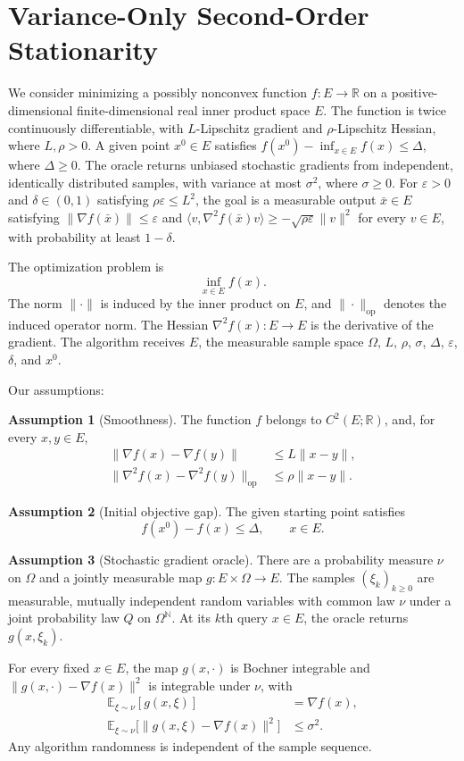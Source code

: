 \documentclass[10pt]{article}
\theoremstyle{definition}
\newtheorem{assumption}{Assumption}
\begin{document}
\section*{Variance-Only Second-Order Stationarity}
We consider minimizing a possibly nonconvex function $f:E\to\mathbb{R}$ on a positive-dimensional finite-dimensional real inner product space $E$. The function is twice continuously differentiable, with $L$-Lipschitz gradient and $\rho$-Lipschitz Hessian, where $L,\rho>0$. A given point $x^0\in E$ satisfies $f(x^0)-\inf_{x\in E}f(x)\leq\Delta$, where $\Delta\geq0$. The oracle returns unbiased stochastic gradients from independent, identically distributed samples, with variance at most $\sigma^2$, where $\sigma\geq0$. For $\varepsilon>0$ and $\delta\in(0,1)$ satisfying $\rho\varepsilon\leq L^2$, the goal is a measurable output $\bar{x}\in E$ satisfying $\|\nabla f(\bar{x})\|\leq\varepsilon$ and $\langle v,\nabla^2 f(\bar{x})v\rangle\geq-\sqrt{\rho\varepsilon}\|v\|^2$ for every $v\in E$, with probability at least $1-\delta$.

The optimization problem is
\[
\inf_{x\in E} f(x).
\]
The norm $\|\cdot\|$ is induced by the inner product on $E$, and $\|\cdot\|_{\mathrm{op}}$ denotes the induced operator norm. The Hessian $\nabla^2 f(x):E\to E$ is the derivative of the gradient. The algorithm receives $E$, the measurable sample space $\Omega$, $L$, $\rho$, $\sigma$, $\Delta$, $\varepsilon$, $\delta$, and $x^0$.

Our assumptions:
\begin{assumption}[Smoothness]
The function $f$ belongs to $C^2(E;\mathbb{R})$, and, for every $x,y\in E$,
\[
\begin{aligned}
\|\nabla f(x)-\nabla f(y)\|&\leq L\|x-y\|,\\
\|\nabla^2 f(x)-\nabla^2 f(y)\|_{\mathrm{op}}&\leq\rho\|x-y\|.
\end{aligned}
\]
\end{assumption}

\begin{assumption}[Initial objective gap]
The given starting point satisfies
\[
f(x^0)-f(x)\leq\Delta,
\qquad x\in E.
\]
\end{assumption}

\begin{assumption}[Stochastic gradient oracle]
There are a probability measure $\nu$ on $\Omega$ and a jointly measurable map $g:E\times\Omega\to E$. The samples $(\xi_k)_{k\geq0}$ are measurable, mutually independent random variables with common law $\nu$ under a joint probability law $Q$ on $\Omega^{\mathbb{N}}$. At its $k$th query $x\in E$, the oracle returns $g(x,\xi_k)$.

For every fixed $x\in E$, the map $g(x,\cdot)$ is Bochner integrable and $\|g(x,\cdot)-\nabla f(x)\|^2$ is integrable under $\nu$, with
\[
\begin{aligned}
\mathbb{E}_{\xi\sim\nu}[g(x,\xi)]&=\nabla f(x),\\
\mathbb{E}_{\xi\sim\nu}\bigl[\|g(x,\xi)-\nabla f(x)\|^2\bigr]&\leq\sigma^2.
\end{aligned}
\]
Any algorithm randomness is independent of the sample sequence.
\end{assumption}
\end{document}

